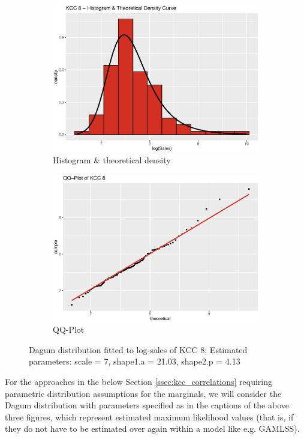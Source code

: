 \begin{figure}[H]
\centering
\begin{subfigure}{.45\textwidth}
  \centering
  \includegraphics[width=\linewidth]{figures/kcc_8_density.eps}
  \caption{Histogram \& theoretical density}
  \label{fig:kcc_8_density}
\end{subfigure}
\begin{subfigure}{.45\textwidth}
  \centering
  \includegraphics[width=\linewidth]{figures/kcc_8_qqplot.eps}
  \caption{QQ-Plot}
  \label{fig:kcc_8_qqplot}
\end{subfigure}
\caption{Dagum distribution fitted to log-sales of \ac{KCC} 8; Estimated parameters: scale = 7, shape1.a = 21.03, shape2.p = 4.13}
\label{fig:kcc_8_marginal}
\end{figure} 


For the approaches in the below Section \ref{ssec:kcc_correlations} requiring parametric distribution assumptions for the marginals, we will consider the Dagum distribution with parameters specified as in the captions of the above three figures, which represent estimated maximum likelihood values (that is, if they do not have to be estimated over again within a model like e.g. \ac{GAMLSS}).



